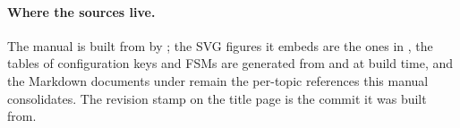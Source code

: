 \paragraph{Where the sources live.} The manual is built from  by
; the SVG figures it embeds are the ones in , the tables of
configuration keys and FSMs are generated from  and 
at build time, and the Markdown documents under  remain the per-topic references
this manual consolidates. The revision stamp on the title page is the commit it was built from.
